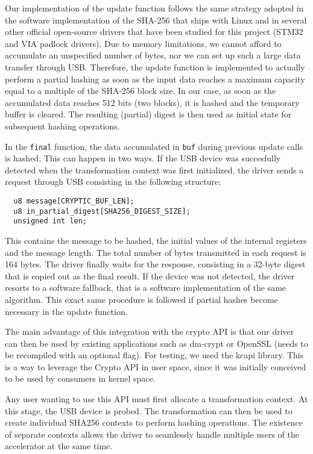 Our implementation of the update function follows the same strategy adopted in the software implementation of the SHA-256 that ships with Linux and in several other official open-source drivers that have been studied for this project (STM32 and VIA padlock drivers). Due to memory limitations, we cannot afford to accumulate an unspecified number of bytes, nor we can set up such a large data transfer through USB. Therefore,
the update function is implemented to actually perform a partial hashing as soon as the input data reaches a maximum capacity equal to a multiple of the SHA-256 block size. In our case, as soon as the accumulated data reaches 512 bits (two blocks), it is hashed and the temporary buffer is cleared. The resulting (partial) digest is then used as initial state for subsequent hashing operations. 

In the \texttt{final} function, the data accumulated in \texttt{buf} during previous update calls is hashed. This can happen in two ways. If the USB device was succesfully detected when the transformation context was first initialized, the driver sends a request through USB consisting in the following structure:

\begin{lstlisting}
  u8 message[CRYPTIC_BUF_LEN];
  u8 in_partial_digest[SHA256_DIGEST_SIZE];
  unsigned int len;
\end{lstlisting}

This contains the message to be hashed, the initial values of the internal registers and the message length. The total number of bytes transmitted in each request is 164 bytes. The driver finally waits for the response, consisting in a 32-byte digest that is copied out as the final result.
If the device was not detected, the driver resorts to a software fallback, that is a software implementation of the same algorithm.
This exact same procedure is followed if partial hashes become necessary in the update function.

The main advantage of this integration with the crypto API is that our driver can then be used by existing applications such as dm-crypt or OpenSSL (needs to be recompiled with an optional flag). For testing, we used the kcapi library. This is a way to leverage the Crypto API in user space, since it was initially conceived to be used by consumers in kernel space.

Any user wanting to use this API must first allocate a transformation context. At this stage, the USB device is probed. The transformation can then be used to create individual SHA256 contexts to perform hashing operations. The existence of separate contexts allows the driver to seamlessly handle multiple users of the accelerator at the same time. 

